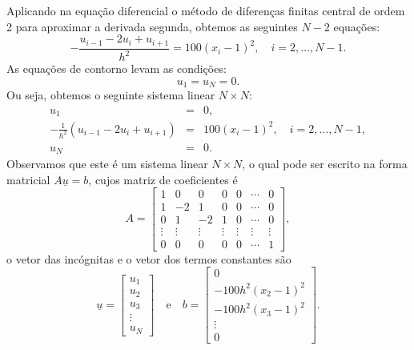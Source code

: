 Aplicando na equação diferencial o método de diferenças finitas central de ordem 2 para aproximar a derivada segunda, obtemos as seguintes $N-2$ equações:
\begin{equation*}
  - \frac{u_{i-1} - 2u_i + u_{i+1}}{h^2} = 100(x_i - 1)^2,\quad i = 2, \dotsc, N-1.
\end{equation*}
As equações de contorno levam as condições:
\begin{equation*}
  u_1 = u_N = 0.
\end{equation*}
Ou seja, obtemos o seguinte sistema linear $N\times N$:
\begin{eqnarray}
  u_1 &=& 0,\label{eq:pvc2_disc_bc1}\\
  -\frac{1}{h^2}\left(u_{i-1} - 2u_i + u_{i+1}\right) &=& 100(x_i-1)^2,\quad i=2, \dotsc, N-1,\\
  u_N &=& 0.\label{eq:pvc2_disc_bc2}
\end{eqnarray}
Observamos que este é um sistema linear $N\times N$, o qual pode ser escrito na forma matricial $A\underline{u} = b$, cujos matriz de coeficientes é
\begin{equation*}
  A = 
  \begin{bmatrix}
    1 & 0 & 0 & 0 & 0 & \cdots & 0\\
    1 & -2 & 1 & 0 & 0 & \cdots & 0\\
    0 & 1 & -2 & 1 & 0 & \cdots & 0\\
    \vdots & \vdots & \vdots & \vdots & \vdots & \vdots & \vdots\\
    0 & 0 & 0 & 0 & 0 & \cdots & 1
  \end{bmatrix},
\end{equation*}
o vetor das incógnitas e o vetor dos termos constantes são
\begin{equation*}
  \underline{u} =
  \begin{bmatrix}
    u_1\\
    u_2\\
    u_3\\
    \vdots\\
    u_N
  \end{bmatrix}\quad\text{e}\quad
  b =
  \begin{bmatrix}
    0\\
    -100h^{2}(x_2-1)^2\\
    -100h^{2}(x_3-1)^2\\
    \vdots\\
    0
  \end{bmatrix}.
\end{equation*}
